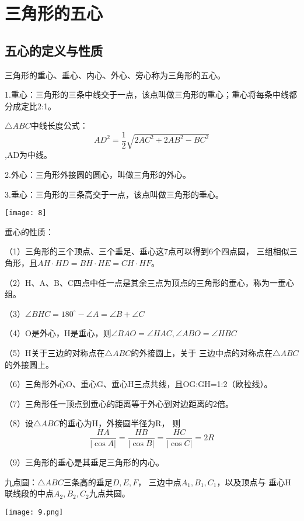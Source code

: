 \section{三角形的五心}
\subsection{五心的定义与性质}
三角形的重心、垂心、内心、外心、旁心称为三角形的五心。


1.重心：三角形的三条中线交于一点，该点叫做三角形的重心；重心将每条中线都分成定比2:1。

$\bigtriangleup{ABC}$中线长度公式：
$$AD^2=\frac{1}{2}\sqrt{2AC^2+2AB^2-BC^2}$$,AD为中线。


2.外心：三角形外接圆的圆心，叫做三角形的外心。



3.垂心：三角形的三条高交于一点，该点叫做三角形的垂心。
\begin{center}
    \texttt{[image: 8]}
\end{center}

垂心的性质：

（1）三角形的三个顶点、三个垂足、垂心这7点可以得到6个四点圆，
三组相似三角形，且$AH\cdot HD=BH\cdot HE=CH\cdot HF$。

（2）H、A、B、C四点中任一点是其余三点为顶点的三角形的垂心，称为一垂心组。

（3）$\angle{BHC}=180^{\circ}-\angle{A}=\angle{B}+\angle{C}$

（4）O是外心，H是垂心，则$\angle{BAO}=\angle{HAC},\angle{ABO}=\angle{HBC}$

（5）H关于三边的对称点在$\bigtriangleup{ABC}$的外接圆上，关于
三边中点的对称点在$\bigtriangleup{ABC}$的外接圆上。

（6）三角形外心O、重心G、垂心H三点共线，且OG:GH=1:2（欧拉线）。

（7）三角形任一顶点到垂心的距离等于外心到对边距离的2倍。

（8）设$\bigtriangleup{ABC}$的垂心为H，外接圆半径为R，
则
$$
\frac{HA}{|\cos{A}|}=\frac{HB}{|\cos{B}|}=\frac{HC}{|\cos{C}|}=2R
$$

（9）三角形的垂心是其垂足三角形的内心。

九点圆：$\bigtriangleup{ABC}$三条高的垂足$D,E,F$，
三边中点$A_1,B_1,C_1$，以及顶点与
垂心H联线段的中点$A_2,B_2,C_2$九点共圆。
\begin{center}
    \texttt{[image: 9.png]}
\end{center}

